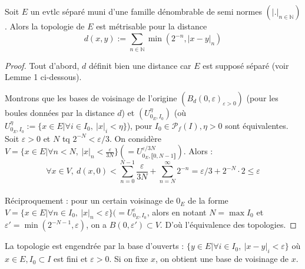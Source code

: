 \begin{propriete}
    Soit $E$ un evtlc séparé muni d'une famille dénombrable de semi normes $(|.|_{n \in \mathbb{N}})$. Alors la topologie de $E$ est métrisable pour la distance $$d(x,y):=\sum\limits_{n\in \mathbb{N} }^{} \min(2^{-n}, |x-y|_n)$$
\end{propriete}
\begin{proof}
    Tout d'abord, $d$ définit bien une distance car $E$ est supposé séparé (voir Lemme 1 ci-dessous).
    
    Montrons que les bases de voisinage de l'origine $(B_d(0,\varepsilon )_{\varepsilon >0})$ (pour les boules données par la distance $d$) et $\left(U_{0_E,I_0}^\eta\right)$ (où $U_{0_E,I_0}^\eta := \{x\in E| \forall i\in I_0,\ |x|_i<\eta \}$), pour $I_0 \in \mathcal{P}_f(I),\eta>0$ sont équivalentes.\\
    
    Soit $\varepsilon >0$ et $N$ tq $2^{-N}<\varepsilon /3$. On considère $V=\{x\in E|\forall n<N,\ |x|_n<\frac{\varepsilon}{3N} \} (= U_{0_E,\llbracket 0, N-1 \rrbracket}^{\varepsilon/3N})$. Alors : 
    $$\forall x\in V,\ d(x,0)<\sum\limits_{n=0}^{N-1} \frac{\varepsilon}{3N}+\sum\limits_{n=N}^{\infty} 2^{-n}=\varepsilon /3+2^{-N} \cdot 2\le \varepsilon $$\\
    Réciproquement : pour un certain voisinage de $0_E$ de la forme $V=\{x\in E|\forall n\in I_0,\ |x|_n<\varepsilon \} (= U_{0_E,I_0}^\varepsilon$, alors en notant $N = \max I_0$ et $\varepsilon ' = \min(2^{-N-1},\varepsilon)$, on a $B(0,\varepsilon ' ) \subset V$. D'où l'équivalence des topologies.
    
\end{proof}


La topologie est engendrée par la base d'ouverts : $\{y\in E|\forall i\in I_0,\ |x-y|_i<\varepsilon  \} $ où $x\in E, I_0\subset I$ est fini et $\varepsilon >0$. Si on fixe $x$, on obtient une base de voisinage de $x$.

